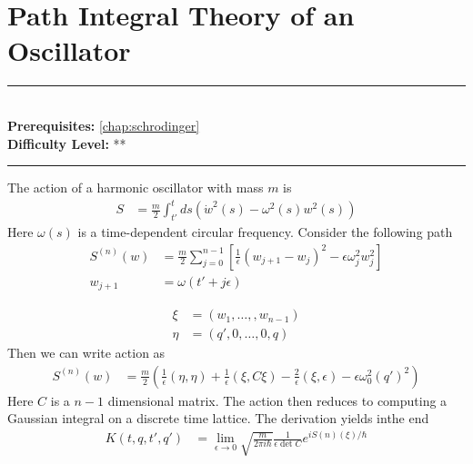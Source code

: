 \documentclass[book.tex]{subfiles}
\begin{document}
\chapter{Path Integral Theory of an Oscillator}

\label{chap:perturbation_theory}
\noindent\rule{11cm}{0.4pt} \\
\textbf{Prerequisites:} \autoref{chap:schrodinger} \\
\textbf{Difficulty Level:} ** \\
\noindent\rule{11cm}{0.4pt}
\vspace{5mm}


The action of a harmonic oscillator with mass $m$ is %
\begin{align}
    S &= \frac{m}{2} \int_{t'}^{t} ds(\dot{w}^2(s)-\omega^2(s) w^2(s))
\end{align}
Here $\omega(s)$ is a time-dependent circular frequency. Consider the following path
\begin{align}
S^{(n)}(w) &= \frac{m}{2}\sum_{j=0}^{n-1}\left [ \frac{1}{\epsilon}(w_{j+1}-w_j)^2 - \epsilon \omega_j^2 w_j^2 \right ] \\
w_{j+1} &= \omega (t' + j\epsilon)
\end{align}

\begin{align}
\xi &= (w_1,\dotsc,,w_{n-1}) \\
\eta &= (q', 0,\dotsc,0, q)
\end{align}
Then we can write action as
\begin{align}
S^{(n)}(w) &= \frac{m}{2} \left ( \frac{1}{\epsilon} (\eta, \eta)  + \frac{1}{\epsilon} (\xi, C \xi) - \frac{2}{\epsilon} (\xi, \epsilon) - \epsilon \omega_0^2 (q')^2 \right )
\end{align}
Here $C$ is a $n-1$ dimensional matrix. The action then reduces to computing a Gaussian integral on a discrete time lattice. The derivation yields inthe end
\begin{align}
K(t, q, t', q') &= \lim_{\epsilon \to 0} \sqrt{\frac{m}{2\pi i \hbar}} \frac{1}{\epsilon \det C} e^{iS(n)(\xi)/\hbar}
\end{align}
\end{document}
